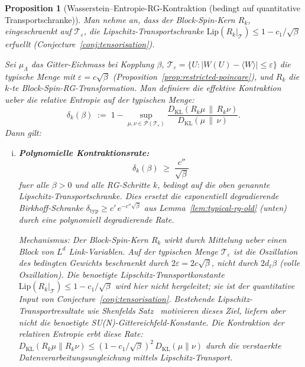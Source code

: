 \documentclass[12pt,a4paper]{article}
\theoremstyle{definition}
\theoremstyle{plain}
\newtheorem{proposition}[definition]{Proposition}
\theoremstyle{remark}
\begin{document}
\begin{proposition}[Wasserstein--Entropie-RG-Kontraktion (bedingt auf quantitative Transportschranke)]\label{prop:wasserstein-rg}
Man nehme an, dass der Block-Spin-Kern $R_k$, eingeschraenkt auf $\mathcal{T}_\varepsilon$, die Lipschitz-Transportschranke $\mathrm{Lip}(R_k|_{\mathcal{T}}) \leq 1 - c_1/\sqrt{\beta}$ erfuellt (Conjecture~\ref{conj:tensorisation}).

\medskip
\noindent
Sei $\mu_\Lambda$ das Gitter-Eichmass bei Kopplung $\beta$,
$\mathcal{T}_\varepsilon = \{U : |W(U) - \langle W\rangle| \leq \varepsilon\}$
die typische Menge mit $\varepsilon = c\sqrt{\beta}$
(Proposition~\ref{prop:restricted-poincare}),
und $R_k$ die $k$-te Block-Spin-RG-Transformation.
Man definiere die \emph{effektive Kontraktion} ueber die relative Entropie auf der typischen Menge:
\begin{equation}\label{eq:wasserstein-contraction}
  \delta_k(\beta) \;:=\; 1 - \sup_{\mu,\nu \in \mathcal{P}(\mathcal{T}_\varepsilon)}
  \frac{D_{\mathrm{KL}}(R_k\mu \,\|\, R_k\nu)}{D_{\mathrm{KL}}(\mu \,\|\, \nu)}.
\end{equation}
Dann gilt:
\begin{enumerate}[(i)]
\item \textbf{Polynomielle Kontraktionsrate:}
  \begin{equation}\label{eq:polynomial-rate}
    \delta_k(\beta) \;\geq\; \frac{c''}{\sqrt{\beta}}
  \end{equation}
  fuer alle $\beta > 0$ und alle RG-Schritte $k$, bedingt auf die oben genannte Lipschitz-Transportschranke.
  Dies ersetzt die exponentiell degradierende Birkhoff-Schranke
  $\delta_{\mathrm{typ}} \geq c'\,e^{-c''\sqrt{\beta}}$
  aus Lemma~\ref{lem:typical-rg-old} (unten) durch eine \emph{polynomiell}
  degradierende Rate.

  \emph{Mechanismus:} Der Block-Spin-Kern $R_k$ wirkt durch Mittelung ueber
  einen Block von $L^d$ Link-Variablen. Auf der typischen Menge $\mathcal{T}_\varepsilon$
  ist die Oszillation des bedingten Gewichts beschraenkt durch $2\varepsilon = 2c\sqrt{\beta}$,
  nicht durch $2 d_\ell \beta$ (volle Oszillation).
  Die benoetigte Lipschitz-Transportkonstante
  $\mathrm{Lip}(R_k|_{\mathcal{T}}) \leq 1 - c_1/\sqrt{\beta}$
  wird hier nicht hergeleitet; sie ist der quantitative Input von
  Conjecture~\ref{conj:tensorisation}. Bestehende Lipschitz-Transportresultate
  wie Shenfelds Satz~\cite{Shenfeld2024} motivieren dieses Ziel, liefern aber
  nicht die benoetigte SU(N)-Gittereichfeld-Konstante.
  Die Kontraktion der relativen Entropie erbt diese Rate:
  $D_{\mathrm{KL}}(R_k\mu \| R_k\nu) \leq (1 - c_1/\sqrt{\beta})^2 \,D_{\mathrm{KL}}(\mu\|\nu)$
  durch die verstaerkte Datenverarbeitungsungleichung mittels Lipschitz-Transport.


\end{enumerate}
\end{proposition}
\end{document}

